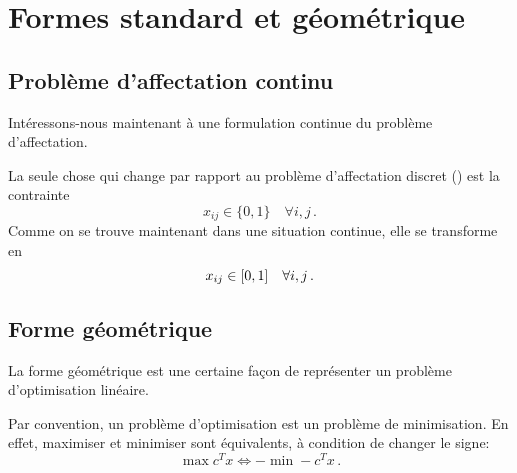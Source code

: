 \section{Formes standard et géométrique}

\subsection{Problème d'affectation continu}

	Intéressons-nous maintenant
	à une formulation continue du problème d'affectation.

	La seule chose qui change
	par rapport au problème d'affectation discret ()
	est la contrainte
	\[
	x_{ij} \in \{0, 1\} \quad \forall i,j\,.
	\]
	Comme on se trouve maintenant dans une situation continue,
	elle se transforme en
	\[
	x_{ij} \in \interval{0}{1} \quad \forall i,j\,.
	\]

\subsection{Forme géométrique}

	La forme géométrique est une certaine façon
	de représenter un problème d'optimisation linéaire.

	Par convention, un problème d'optimisation
	est un problème de minimisation.
	En effet, maximiser et minimiser sont équivalents,
	à condition de changer le signe:
	\[
	\max c^T x \iff -\min -c^T x\,.
	\]

